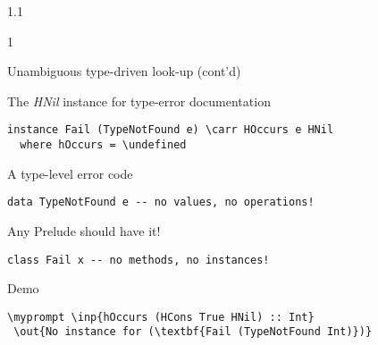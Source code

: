\documentclass{slides}
\newenvironment{myslide}{\begin{slide}\color{Blue}\begin{boxedminipage}{1.1\hsize}\begin{boxedminipage}{1\hsize}\color{Black}
\vspace{-170\in}
}{%
\smallskip
\end{boxedminipage}
\end{boxedminipage}
\end{slide}}
\newenvironment{myslide}{\begin{slide}
}{%
\end{slide}}
\newenvironment{myslide}{\begin{slide}\color{White}\begin{boxedminipage}{1.1\hsize}\color{Black}
\vspace{-170\in}
}{%
\smallskip
\end{boxedminipage}
\end{slide}}
\newcommand{\header}[1]{{\large \color{Red} #1}}
\newcommand{\inp}[1]{{\color{Brown} \mytextbf{#1}}}
\newcommand{\out}[1]{{\color{Black} \mytextbf{#1}}}
\newcommand{\blau}[1]{{\vspace{-50\in}\normalsize \color{Blue} #1}}
\newcommand{\undefined}{\ensuremath{\bot}}
\newcommand{\carr}{\ensuremath{\Rightarrow}}
\newcommand{\myprompt}{ghci\ensuremath{>}}
\newcommand{\mytextbf}[1]{\texttt{\textbf{#1}}}
\begin{document}
\begin{myslide}

\header{Unambiguous type-driven look-up (cont'd)}

\vspace{-77\in}

\blau{The \emph{HNil} instance for type-error documentation}

\smallskip

\begin{Verbatim}[fontfamily=courier,fontsize=\small,commandchars=\\\{\}]
 instance Fail (TypeNotFound e) \carr HOccurs e HNil
  where hOccurs = \undefined
\end{Verbatim}

\vspace{-77\in}

\blau{A type-level error code}

\smallskip

\begin{Verbatim}[fontfamily=courier,fontsize=\small,commandchars=\\\{\}]
 data TypeNotFound e -- no values, no operations! 
\end{Verbatim}

\vspace{-77\in}

\blau{Any Prelude should have it!}

\smallskip

\begin{Verbatim}[fontfamily=courier,fontsize=\small,commandchars=\\\{\}]
 class Fail x -- no methods, no instances!
\end{Verbatim}

\vspace{-77\in}

\blau{Demo}

\smallskip

\begin{Verbatim}[fontfamily=courier,fontsize=\small,commandchars=\\\{\}]
 \myprompt \inp{hOccurs (HCons True HNil) :: Int}
 \out{No instance for (\textbf{Fail (TypeNotFound Int)})}
\end{Verbatim}


\end{myslide}



\end{document}

